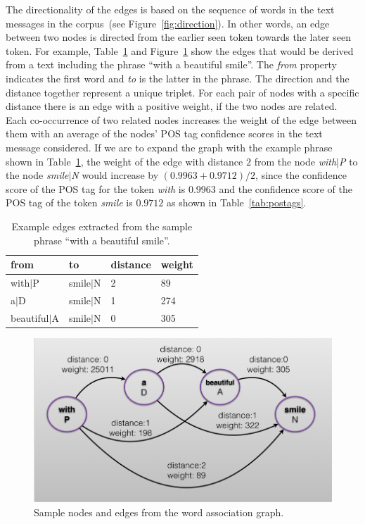 \documentclass[a4paper,onesided,12pt]{report}
\begin{document}
The directionality of the edges is based  on the sequence of words in the text messages in the corpus~(see Figure~\ref{fig:direction}). In other words, an edge between two nodes is directed from the earlier seen token towards the later seen token. For example, Table~\ref{tab:edges} and Figure~\ref{fig:edges} show the edges that would be derived from a text including the phrase ``with a beautiful smile''. The \textit{from} property indicates the first word and \textit{to} is the latter in the phrase. The direction and the distance together represent a unique triplet. For each pair of nodes with a specific distance there is an edge with a positive weight, if the two nodes are related. Each co-occurrence of two related nodes increases the weight of the edge between them with an average of the nodes' POS tag confidence scores in the text message considered. If we are to expand the graph with the example phrase shown in Table~\ref{tab:edges}, the weight of the edge with distance $2$ from the node \emph{with$|$P}  to the node  \emph{smile$|$N} would increase by $(0.9963+0.9712)/2$, since the confidence score of the POS tag for the token \emph{with} is  $0.9963$ and the confidence score of the POS tag of the token \emph{smile} is $0.9712$ as shown in Table~\ref{tab:postags}.

\begin{table}[hbt]
  \caption{Example edges extracted from the sample phrase  ``with a beautiful smile''.}
  \centering
  \begin{tabular}[tc]{|l|l|l|l|}
    \hline
\textbf{from} & \textbf{to} & \textbf{distance} & \textbf{weight} \\ \hline
 with$|$P &  smile$|$N & 2 & 89 \\ \hline
 a$|$D & smile$|$N & 1 & 274 \\ \hline
 beautiful$|$A & smile$|$N & 0 & 305 \\ \hline
\end{tabular}
\label{tab:edges}
\end{table}

\begin{figure}[htb]
\begin{center}
\includegraphics[scale=0.5]{fig/edges}
\caption{Sample nodes and edges from the word association graph.}
\label{fig:edges}
\end{center}
\end{figure}
\end{document}
